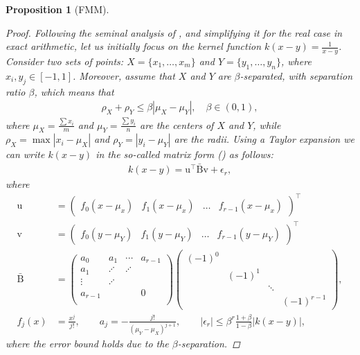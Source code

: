 \documentclass{article}
\newtheorem{proposition}{Proposition}[section]
\newcommand\vecu{\boldsymbol{\mathrm{u}}}
\newcommand\vecv{\boldsymbol{\mathrm{v}}}
\newcommand\matBbar{\bar{\boldsymbol{\mathrm{B}}}}
\begin{document}
\begin{proposition}[FMM]
\begin{proof}
    Following the seminal analysis of \cite[Sec. 2.1]{cai2020stable}, and simplifying it for the real case in exact arithmetic, let us initially focus on the kernel function $k(x-y)=\frac{1}{x-y}$. Consider  two sets of points: $X=\{x_1,\ldots,x_m\}$ and $Y=\{y_1,\ldots,y_n\}$, where  $x_i,y_j\in[-1,1]$. Moreover, assume that $X$ and $Y$ are \emph{$\beta$-separated}, with separation ratio $\beta$, which means that
    \begin{align*}
        \rho_X+\rho_Y \leq \beta|\mu_X-\mu_Y|, \quad 
        \beta\in(0,1),
    \end{align*}
    where $\mu_X=\frac{\sum x_i}{m}$ and $\mu_Y=\frac{\sum y_i}{n}$ are the centers of $X$ and $Y$, while $\rho_X=\max|x_i-\mu_X|$ and $\rho_Y=|y_i-\mu_Y|$ are the radii. Using a Taylor expansion we can write $k(x-y)$ in the so-called matrix form (\cite{sun2001matrix}) as follows:
    \begin{align}
        k(x-y)=\vecu^\top\matBbar\vecv + \epsilon_r,
        \label{eq:fmm_matvec_formulation}
    \end{align}
    where 
    \begingroup
    \allowdisplaybreaks
    \begin{align*}
        \vecu &= \begin{pmatrix}
            f_0(x-\mu_x) & f_1(x-\mu_x) & \ldots & f_{r-1}(x-\mu_x)
        \end{pmatrix}^\top
        \\
        \vecv &= \begin{pmatrix}
            f_0(y-\mu_Y) & f_1(y-\mu_Y) & \ldots & f_{r-1}(y-\mu_Y)
        \end{pmatrix}^\top
        \\
        \matBbar&=\begin{pmatrix}
            a_0 & a_1 &\cdots & a_{r-1}\\
            a_1 & \iddots & \iddots & \\
            \vdots & \iddots &  &\\
            a_{r-1} & & & 0\\
        \end{pmatrix}
        \begin{pmatrix}
            (-1)^0 & & & \\
            & (-1)^1 & &\\
            & & \ddots & \\
            & & & (-1)^{r-1}
        \end{pmatrix},
        \\
        f_j(x) &= \frac{x^j}{j!}, 
        \qquad 
        a_j=-\frac{j!}{(\mu_Y-\mu_X)^{j+1}}, 
        \qquad
        |\epsilon_r|\leq \beta^r\frac{1+\beta}{1-\beta}|k(x-y)|,
    \end{align*}
    \endgroup
    where the error bound holds due to the $\beta$-separation.
    

\end{proof}
\end{proposition}
\end{document}
